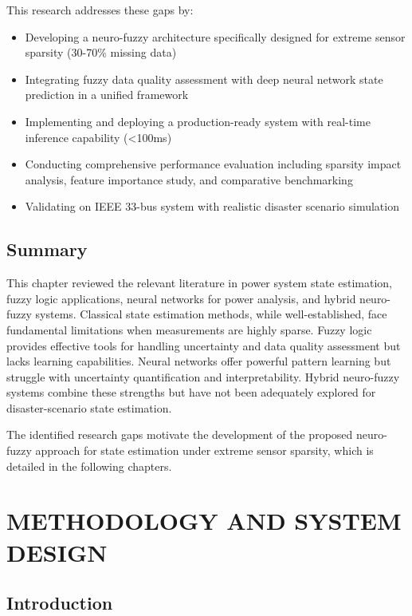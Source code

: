 \documentclass[12pt,a4paper]{report}
\begin{document}
This research addresses these gaps by:

\begin{itemize}
    \item Developing a neuro-fuzzy architecture specifically designed for extreme sensor sparsity (30-70\% missing data)
    \item Integrating fuzzy data quality assessment with deep neural network state prediction in a unified framework
    \item Implementing and deploying a production-ready system with real-time inference capability (<100ms)
    \item Conducting comprehensive performance evaluation including sparsity impact analysis, feature importance study, and comparative benchmarking
    \item Validating on IEEE 33-bus system with realistic disaster scenario simulation
\end{itemize}

\section{Summary}

This chapter reviewed the relevant literature in power system state estimation, fuzzy logic applications, neural networks for power analysis, and hybrid neuro-fuzzy systems. Classical state estimation methods, while well-established, face fundamental limitations when measurements are highly sparse. Fuzzy logic provides effective tools for handling uncertainty and data quality assessment but lacks learning capabilities. Neural networks offer powerful pattern learning but struggle with uncertainty quantification and interpretability. Hybrid neuro-fuzzy systems combine these strengths but have not been adequately explored for disaster-scenario state estimation.

The identified research gaps motivate the development of the proposed neuro-fuzzy approach for state estimation under extreme sensor sparsity, which is detailed in the following chapters.

\chapter{METHODOLOGY AND SYSTEM DESIGN}

\section{Introduction}
\end{document}
